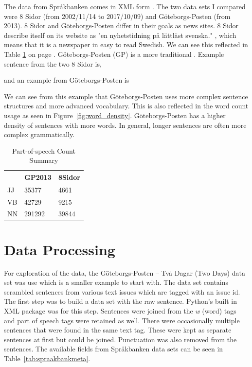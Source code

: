 \documentclass[11pt,a4paper]{article}
\begin{document}
The data from Språkbanken comes in XML form  \cite{spraakbanken}.
The two data sets I compared were 8 Sidor (from 2002/11/14 to 2017/10/09) and Göteborgs-Posten (from 2013).
8 Sidor and Göteborgs-Posten differ in their goals as news sites.
8 Sidor describe itself on its website as "en nyhetstidning på lättläst svenska." \cite{8sidor}, which means that it is a newspaper in easy to read Swedish.
We can see this reflected in Table \ref{tab:possum} on page \pageref{tab:possum}.
Göteborgs-Posten (GP) is a more traditional  \cite{wiki:gp}.
Example sentence from the two 8 Sidor is, 

\begin{displayquote}
\end{displayquote}

and an example from Göteborgs-Posten is

\begin{displayquote}
\end{displayquote}

We can see from this example that Göteborgs-Posten uses more complex sentence structures and more advanced vocabulary.
This is also reflected in the word count usage as seen in Figure~\ref{fig:word_density}.
Göteborgs-Posten has a higher density of sentences with more words.
In general, longer sentences are often more complex grammatically.


\begin{table}[]
\centering
\begin{tabular}{lll}
\hline
& GP2013 & 8Sidor        \\ \hline
JJ     & 35377  & 4661  \\
VB     & 42729  & 9215  \\
NN     & 291292 & 39844 \\ \hline
\end{tabular}
\caption{Part-of-speech Count Summary} \label{tab:possum}
\end{table}

\section{Data Processing}

For exploration of the data, the Göteborgs-Posten -- Två Dagar (Two Days) data set was use which is a smaller example to start with.
The data set contains scrambled sentences from various text issues which are tagged with an issue id.
The first step was to build a data set with the raw sentence.
Python's built in XML package was for this step.
Sentences were joined from the \textit{w} (word) tags and part of speech tags were retained as well.
There were occasionally multiple sentences that were found in the same text tag.
These were kept as separate sentences at first but could be joined.
Punctuation was also removed from the sentences.
The available fields from Språkbanken data sets can be seen in Table~\ref{tab:spraakbankmeta}.
\end{document}
